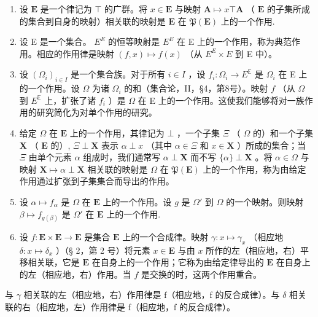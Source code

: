 \begin{enumerate}
\def\labelenumi{(\arabic{enumi})}
\setcounter{enumi}{1}
\item
  设 \(\mathbf{E}\) 是一个律记为 \(\top\) 的广群。将 \(x \in \mathbf{E}\) 与映射 \(\mathbf{A} \mapsto x \top \mathbf{A}\) （ \(\mathbf{E}\) 的子集所成的集合到自身的映射）相关联的映射是 \(\mathbf{E}\) 在 \(\mathfrak{P}(\mathbf{E})\) 上的一个作用.
\item
  设 E 是一个集合。 \(E^{E}\) 的恒等映射是 \(E^{E}\) 在 E 上的一个作用，称为典范作用。相应的作用律是映射 \((f, x) \mapsto f(x)\) （从 \(E^{E} \times E\) 到 E 中）。
\item
  设 \((\Omega_{i})_{i\in I}\) 是一个集合族。对于所有 \(i\in I\) ，设 \(f_{i}\colon \Omega_{i}\to E^{\mathbb{E}}\) 是 \(\Omega_{i}\) 在 E 上的一个作用。设 \(\Omega\) 为诸 \(\Omega_{i}\) 的和（集合论，II，§4，第8号）。映射 \(f\) （从 \(\Omega\) 到 \(E^{\mathbb{E}}\) 上，扩张了诸 \(f_{i}\) ）是 \(\Omega\) 在 E 上的一个作用。这使我们能够将对一族作用的研究简化为对单个作用的研究。
\item
  给定 \(\Omega\) 在 \(\mathbf{E}\) 上的一个作用，其律记为 \(\bot\) ，一个子集 \(\Xi\) （ \(\Omega\) 的）和一个子集 \(\mathbf{X}\) （ \(\mathbf{E}\) 的）, \(\Xi \perp \mathbf{X}\) 表示 \(\alpha \perp x\) （其中 \(\alpha \in \Xi\) 和 \(x \in \mathbf{X}\) ）所成的集合；当 \(\Xi\) 由单个元素 \(\alpha\) 组成时，我们通常写 \(\alpha \perp \mathbf{X}\) 而不写 \(\{\alpha\} \perp \mathbf{X}\) 。将 \(\alpha \in \Omega\) 与映射 \(\mathbf{X} \mapsto \alpha \perp \mathbf{X}\) 相关联的映射是 \(\Omega\) 在 \(\mathfrak{P}(\mathbf{E})\) 上的一个作用，称为由给定作用通过扩张到子集集合而导出的作用。
\item
  设 \(\alpha \mapsto f_{\alpha}\) 是 \(\Omega\) 在 \(\mathbf{E}\) 上的一个作用。设 \(g\) 是 \(\Omega'\) 到 \(\Omega\) 的一个映射。则映射 \(\beta \mapsto f_{g(\beta)}\) 是 \(\Omega'\) 在 \(\mathbf{E}\) 上的一个作用.
\item
  设 \(f: \mathbf{E} \times \mathbf{E} \to \mathbf{E}\) 是集合 \(\mathbf{E}\) 上的一个合成律。映射 \(\gamma: x \mapsto \gamma_x\) （相应地 \(\delta: x \mapsto \delta_x\) ）（§ 2，第 2 号）将元素 \(x \in \mathbf{E}\) 与由 \(x\) 所作的左（相应地，右）平移相关联，它是 \(\mathbf{E}\) 在自身上的一个作用；它称为由给定律导出的 \(\mathbf{E}\) 在自身上的左（相应地，右）作用。当 \(f\) 是交换的时，这两个作用重合。
\end{enumerate}

与 \(\gamma\) 相关联的左（相应地，右）作用律是 f（相应地，f 的反合成律）。与 \(\delta\) 相关联的右（相应地，左）作用律是 f（相应地，f 的反合成律）。

